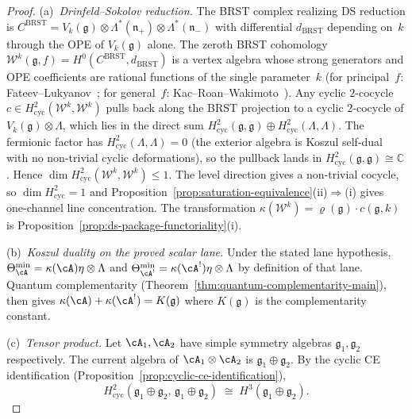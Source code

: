 \begin{proof}
(a)~\emph{Drinfeld--Sokolov reduction.}
The BRST complex realizing DS reduction is
$C^{\mathrm{BRST}} = V_k(\mathfrak{g})
\otimes \Lambda^*(\mathfrak{n}_+)
\otimes \Lambda^*(\mathfrak{n}_-)$
with differential $d_{\mathrm{BRST}}$ depending on~$k$
through the OPE of $V_k(\mathfrak{g})$ alone.
The zeroth BRST cohomology
$\mathcal{W}^k(\mathfrak{g},f) = H^0(C^{\mathrm{BRST}},
d_{\mathrm{BRST}})$
is a vertex algebra whose strong generators and OPE
coefficients are rational functions of the single parameter~$k$
(for principal~$f$: Fateev--Lukyanov~\cite{FL88};
for general~$f$: Kac--Roan--Wakimoto~\cite{KRW}).
Any cyclic $2$-cocycle
$c \in H^2_{\mathrm{cyc}}(\mathcal{W}^k, \mathcal{W}^k)$
pulls back along the BRST projection to a cyclic $2$-cocycle
of $V_k(\mathfrak{g}) \otimes \Lambda$, which lies in the
direct sum $H^2_{\mathrm{cyc}}(\mathfrak{g},\mathfrak{g})
\oplus H^2_{\mathrm{cyc}}(\Lambda,\Lambda)$.
The fermionic factor has $H^2_{\mathrm{cyc}}(\Lambda,\Lambda) = 0$
(the exterior algebra is Koszul self-dual with no non-trivial
cyclic deformations), so the pullback lands in
$H^2_{\mathrm{cyc}}(\mathfrak{g},\mathfrak{g}) \cong
\mathbb{C}$.  Hence
$\dim H^2_{\mathrm{cyc}}(\mathcal{W}^k, \mathcal{W}^k) \leq 1$.
The level direction gives a non-trivial cocycle, so
$\dim H^2_{\mathrm{cyc}} = 1$ and
Proposition~\ref{prop:saturation-equivalence}(ii)$\Rightarrow$(i)
gives one-channel line concentration.
The transformation
$\kappa(\mathcal{W}^k) = \varrho(\mathfrak{g}) \cdot
c(\mathfrak{g},k)$
is Proposition~\ref{prop:ds-package-functoriality}(i).

\smallskip\noindent
(b)~\emph{Koszul duality on the proved scalar lane.}
Under the stated lane hypothesis,
$\Theta_{\cA}^{\min} = \kappa(\cA)\eta \otimes \Lambda$
and
$\Theta_{\cA^!}^{\min} = \kappa(\cA^!)\eta \otimes \Lambda$
by definition of that lane.  Quantum complementarity
(Theorem~\ref{thm:quantum-complementarity-main}),
then gives
$\kappa(\cA) + \kappa(\cA^!) = K(\mathfrak{g})$
where $K(\mathfrak{g})$ is the complementarity constant.

\smallskip\noindent
(c)~\emph{Tensor product.}
Let $\cA_1, \cA_2$ have simple symmetry algebras
$\mathfrak{g}_1, \mathfrak{g}_2$ respectively.
The current algebra of $\cA_1 \otimes \cA_2$ is
$\mathfrak{g}_1 \oplus \mathfrak{g}_2$.  By the cyclic
CE identification
(Proposition~\ref{prop:cyclic-ce-identification}),
\[
H^2_{\mathrm{cyc}}(\mathfrak{g}_1 \oplus \mathfrak{g}_2,\,
\mathfrak{g}_1 \oplus \mathfrak{g}_2)
\;\cong\;
H^3(\mathfrak{g}_1 \oplus \mathfrak{g}_2).
\]


\end{proof}
